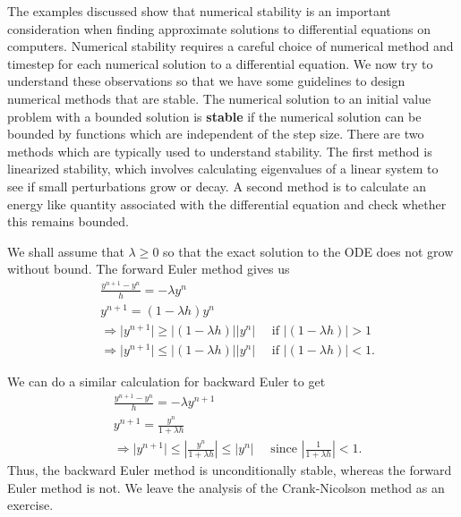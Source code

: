 The examples discussed show that numerical stability is an important consideration when finding approximate solutions to differential equations on computers. Numerical stability requires a careful choice of numerical method and timestep for each numerical solution to a differential equation. We now try to understand these observations so that we have some guidelines to design numerical methods that are stable. The numerical solution to an initial value problem with a bounded solution is {\bf stable} if the numerical solution can be bounded by functions which are independent of the step size. There are two methods which are typically used to understand stability. The first method is linearized stability, which involves calculating eigenvalues of a linear system to see if small perturbations grow or decay. A second method is to calculate an energy like quantity associated with the differential equation and check whether this remains bounded. 

We shall assume that $\lambda\geq0$ so that the exact solution to the ODE does not grow without bound. The forward Euler method gives us
\begin{align*}
&{} \frac{y^{n+1}-y^n}{h}=-\lambda y^n
\\&{} y^{n+1}=(1-\lambda h)y^n
\\&{} \Rightarrow \lvert y^{n+1} \rvert \geq \lvert (1-\lambda h) \rvert \lvert y^n \rvert \quad \text{ if } \lvert (1-\lambda h) \rvert > 1
\\&{} \Rightarrow \lvert y^{n+1} \rvert \leq \lvert (1-\lambda h) \rvert \lvert y^n \rvert \quad \text{ if } \lvert (1-\lambda h) \rvert <1.
\end{align*}

We can do a similar calculation for backward Euler to get
\begin{align*}
&{} \frac{y^{n+1}-y^n}{h}=-\lambda y^{n+1}
\\&{} y^{n+1}=\frac{y^n}{1+\lambda h}
\\&{} \Rightarrow \lvert y^{n+1} \rvert \leq \left\lvert \frac{y^n}{1+\lambda h} \right\rvert \leq \lvert y^n \rvert \quad \text{ since } \left\lvert \frac{1}{1+\lambda h} \right\rvert <1.
\end{align*}
Thus, the backward Euler method is unconditionally stable, whereas the forward Euler method is not. We leave the analysis of the Crank-Nicolson method as an exercise.

